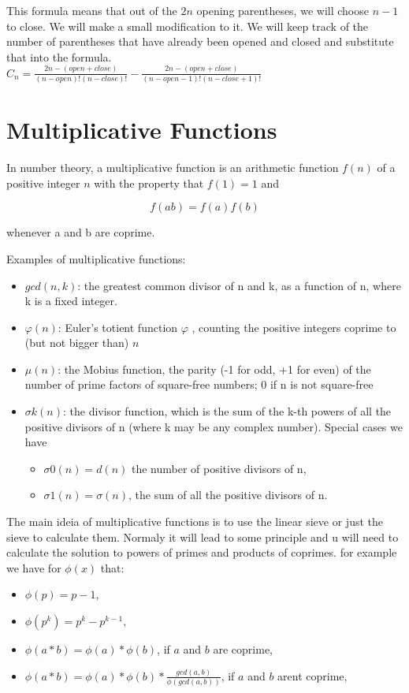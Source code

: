             This formula means that out of the $2n$ opening parentheses, we will choose $n - 1$ to close. We will make a small modification to it. We will keep track of the number of parentheses that have already been opened and closed and substitute that into the formula. \\

            $C_n = \frac{2n - (open + close)}{(n-open)!(n-close)!} - \frac{2n - (open + close)}{(n-open-1)!(n-close+1)!}$


        
    \section{Multiplicative Functions}
   In number theory, a multiplicative function is an arithmetic function $f(n)$ of a positive integer $n$ with the property that $f(1) = 1$ and

$$\displaystyle f(ab)=f(a)f(b)$$

whenever a and b are coprime.

    Examples of multiplicative functions:
    \begin{itemize}
        \item $gcd(n,k)$: the greatest common divisor of n and k, as a function of n, where k is a fixed integer.
\item {$\displaystyle \varphi (n)$}: Euler's totient function 
{$\displaystyle \varphi$ }, counting the positive integers coprime to (but not bigger than) $n$
\item $\mu (n)$: the Mobius function, the parity (-1 for odd, +1 for even) of the number of prime factors of square-free numbers; 0 if n is not square-free
\item $\sigma k(n)$: the divisor function, which is the sum of the k-th powers of all the positive divisors of n (where k may be any complex number). Special cases we have
\begin{itemize}
    \item $\sigma 0(n) = d(n)$ the number of positive divisors of n,
    \item $\sigma 1(n) = \sigma (n)$, the sum of all the positive divisors of n.
\end{itemize}
    \end{itemize}

    The main ideia of multiplicative functions is to use the linear sieve or just the sieve to calculate them. Normaly it will lead to some principle and u will need to calculate the solution to powers of primes and products of coprimes.
    for example we have for $\phi(x)$ that:
    \begin{itemize}
        \item $\phi(p) = p-1$,
        \item $\phi(p^k) = p^k -p^{k-1}$,
        \item $\phi(a*b) = \phi(a) * \phi(b)$, if $a$ and $b$ are coprime,
        \item $\phi(a*b) = \phi(a) * \phi(b) * \frac{gcd(a,b)}{\phi(gcd(a,b))}$, if $a$ and $b$ arent coprime,
    \end{itemize}

